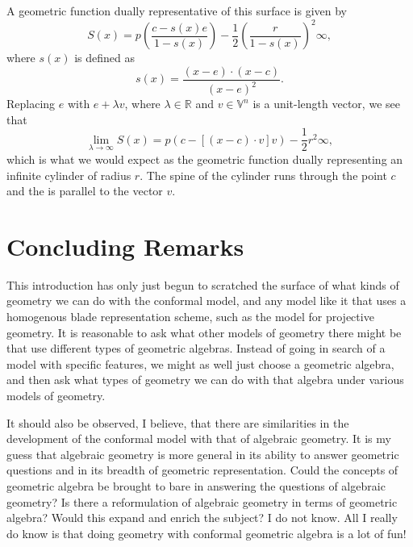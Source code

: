 \documentclass[12pt]{article}
\newcommand{\V}{\mathbb{V}}
\newcommand{\R}{\mathbb{R}}
\newcommand{\nvai}{\infty}
\begin{document}
A geometric function dually representative of this surface is given by
\begin{equation*}
S(x) = p\left(\frac{c-s(x)e}{1-s(x)}\right)-\frac{1}{2}\left(\frac{r}{1-s(x)}\right)^2\nvai,
\end{equation*}
where $s(x)$ is defined as
\begin{equation*}
s(x) = \frac{(x-e)\cdot(x-c)}{(x-e)^2}.
\end{equation*}
Replacing $e$ with $e+\lambda v$, where $\lambda\in\R$ and $v\in\V^n$ is a unit-length vector,
we see that
\begin{equation*}
\lim_{\lambda\to\infty} S(x) = p(c-[(x-c)\cdot v]v)-\frac{1}{2}r^2\nvai,
\end{equation*}
which is what we would expect as the geometric function dually representing an infinite cylinder
of radius $r$.  The spine of the cylinder runs through the point $c$ and the is parallel
to the vector $v$.



\section{Concluding Remarks}

This introduction has only just begun to scratched the surface of
what kinds of geometry we can do with the conformal model, and
any model like it that uses a homogenous blade representation scheme,
such as the model for projective geometry.  It is reasonable to ask
what other models of geometry there might be that use different
types of geometric algebras.  Instead of going in search of a model
with specific features, we might as well just choose a geometric algebra,
and then ask what types of geometry we can do with that algebra under
various models of geometry.

It should also be observed, I believe, that there are similarities in the
development of the conformal model with that of algebraic geometry.
It is my guess that algebraic geometry is more general in its
ability to answer geometric questions and in its breadth of geometric representation.
Could the concepts of geometric algebra be brought to bare in answering the questions of algebraic
geometry?  Is there a reformulation of algebraic geometry in terms of geometric algebra?
Would this expand and enrich the subject?  I do not know.  All I really do know is
that doing geometry with conformal geometric algebra is a lot of fun!




\end{document}
